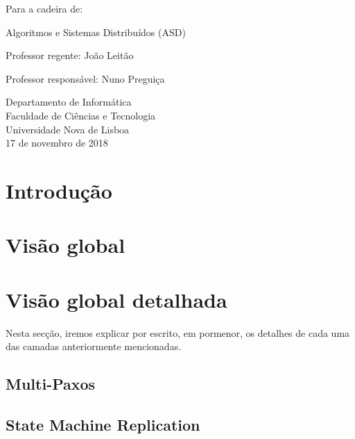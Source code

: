 \documentclass[12pt]{article}
\begin{document}
\begin{titlepage}
\begin{center}
        \vspace{0.5cm}
        
        Para a cadeira de:
        
        Algoritmos e Sistemas Distribuídos (ASD)
        
        \vspace{0.5cm}

		Professor regente: 
		João Leitão
		
		Professor responsável:
		Nuno Preguiça
		
        \vspace{0.5cm}
                
        Departamento de Informática\\
        Faculdade de Ciências e Tecnologia\\
        Universidade Nova de Lisboa\\
        17 de novembro de 2018
    \end{center}
\end{titlepage}

\newpage
\tableofcontents

\newpage
\listoffigures

\newpage
\section{Introdução}


\newpage
\section{Visão global}



\newpage
\section{Visão global detalhada}

Nesta secção, iremos explicar por escrito, em pormenor, os detalhes de cada uma das camadas anteriormente mencionadas.

\subsection{Multi-Paxos}

\newpage
\subsection{State Machine Replication}
\end{document}
